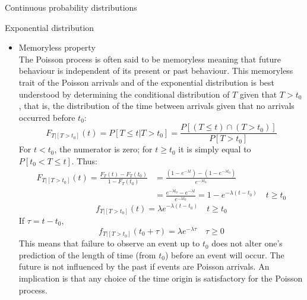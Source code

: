 \documentclass[8pt]{beamer}
\renewcommand{\emph}[1]{\textcolor{myorange}{#1}}
\begin{document}
\begin{frame}{Continuous probability distributions}
    \begin{block}{\alert{Exponential} distribution}
        \begin{itemize}
            \item \emph{Memoryless property}\\
                The \emph{Poisson process} is often said to be \emph{memoryless} meaning that  future behaviour is independent of its present or past behaviour. This memoryless trait of the Poisson arrivals and of the exponential distribution is best understood by determining the conditional distribution of $T$ given that $T > t_0$, that is, the distribution of the time between arrivals given that no arrivals occurred before $t_0$:
                \vspace{-10pt}
                \[
                    F_{T|[T > t_0 ]} (t) = P[T \leq t | T > t_0] = \frac{P\left[(T \leq t) \cap (T > t_0) \right]}{P[T > t_0]}
                \]
                For $t < t_0$, the numerator is zero; for $t \geq t_0$ it is simply equal to $P[t_0 < T \leq t]$. Thus:
                \vspace{-5pt}
         \begin{align*}
             \displaystyle
             F_{T|[T > t_0 ]} (t) = \frac{F_T (t) - F_T (t_0)}{1- F_T (t_0)} &= \frac{(1-e^{-\lambda t}) - (1-e^{-\lambda t_0})}{e^{-\lambda t_0}} \\
                                                                             &= \frac{e^{-\lambda t_0}-e^{-\lambda t}}{e^{-\lambda t_0}} = 1-e^{-\lambda(t-t_0)} \quad t \geq t_0
         \end{align*}
         \[
             f_{T|[T> t_0]} (t) = \lambda e^{-\lambda (t-t_0)} \quad t \geq t_0
         \]
         If $\tau = t - t_0$, 
                \vspace{-5pt}
         \[
             f_{T|[T> t_0]} (t_0 + \tau) = \lambda e^{-\lambda \tau} \quad \tau \geq 0
         \]
          This means that failure to observe an event up to $t_0$ does not alter one's prediction of the length of time (from $t_0$) before an event will occur. The future is not influenced by the past if events are \emph{Poisson arrivals}. An implication is that any choice of the time origin is satisfactory for the \emph{Poisson process}.

        \end{itemize}
        
    \end{block}
\end{frame}
\end{document}

